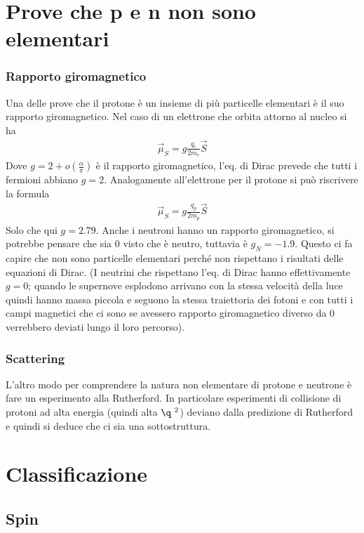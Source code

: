 \documentclass[12pt]{book}
\begin{document}
\section{Prove che p e n non sono elementari}
\subsubsection*{Rapporto giromagnetico}
Una delle prove che il protone è un insieme di più particelle elementari è il suo rapporto giromagnetico. Nel caso di un elettrone che orbita attorno al nucleo si ha
\begin{gather}
	\vec \mu_S = g \frac{q_e}{2 m_e} \vec S
\end{gather} 
Dove $g=2+ o\left( \frac{\alpha}{\pi} \right)$ è il rapporto giromagnetico, l'eq. di Dirac prevede che tutti i fermioni abbiano $g=2$. Analogamente all'elettrone per il protone si può riscrivere la formula
\begin{gather}
	\vec \mu_S = g \frac{q_p}{2 m_p} \vec S
\end{gather} 
Solo che qui $g=2.79$. Anche i neutroni hanno un rapporto giromagnetico, si potrebbe pensare che sia 0 visto che è neutro, tuttavia è $g_N = -1.9$. Questo ci fa capire che non sono particelle elementari perché non rispettano i risultati delle equazioni di Dirac. (I neutrini che rispettano l'eq. di Dirac hanno effettivamente $g=0$; quando le supernove esplodono arrivano con la stessa velocità della luce quindi hanno massa piccola e seguono la stessa traiettoria dei fotoni e con tutti i campi magnetici che ci sono se avessero rapporto giromagnetico diverso da 0 verrebbero deviati lungo il loro percorso). 

\subsubsection*{Scattering}
L'altro modo per comprendere la natura non elementare di protone e neutrone è fare un esperimento alla Rutherford. In particolare esperimenti di collisione di protoni ad alta energia (quindi alta $\q \ ^2$) deviano dalla predizione di Rutherford e quindi si deduce che ci sia una sottostruttura.

\newpage
\section{Classificazione}
\toc
\subsection{Spin}
\end{document}
